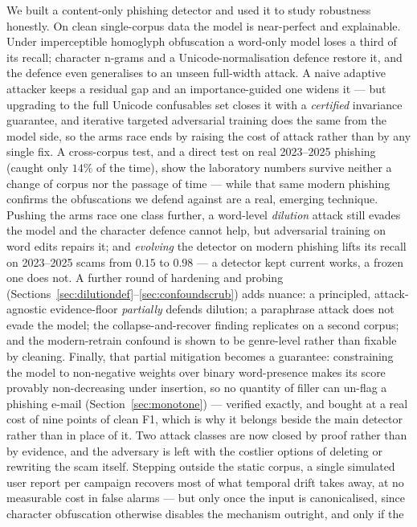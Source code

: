 \documentclass[11pt]{article}
\begin{document}
We built a content-only phishing detector and used it to study robustness honestly.
On clean single-corpus data the model is near-perfect and explainable. Under
imperceptible homoglyph obfuscation a word-only model loses a third of its recall;
character n-grams and a Unicode-normalisation defence restore it, and the defence
even generalises to an unseen full-width attack. A naive adaptive attacker keeps a
residual gap and an importance-guided one widens it --- but upgrading to the full Unicode
confusables set closes it with a \emph{certified} invariance guarantee, and iterative
targeted adversarial training does the same from the model side, so the arms race ends by
raising the cost of attack rather than by any single fix. A cross-corpus test, and a direct
test on real 2023--2025 phishing (caught only $14\%$ of the time), show the laboratory
numbers survive neither a change of corpus nor the passage of time --- while that same modern
phishing confirms the obfuscations we defend against are a real, emerging technique. Pushing the
arms race one class further, a word-level \emph{dilution} attack still evades the model and the
character defence cannot help, but adversarial training on word edits repairs it; and
\emph{evolving} the detector on modern phishing lifts its recall on 2023--2025 scams from $0.15$
to $0.98$ --- a detector kept current works, a frozen one does not.
A further round of hardening and probing (Sections~\ref{sec:dilutiondef}--\ref{sec:confoundscrub})
adds nuance: a principled, attack-agnostic evidence-floor \emph{partially} defends dilution; a
paraphrase attack does not evade the model; the collapse-and-recover finding replicates on a second
corpus; and the modern-retrain confound is shown to be genre-level rather than fixable by cleaning.
Finally, that partial mitigation becomes a guarantee: constraining the model to non-negative weights
over binary word-presence makes its score provably non-decreasing under insertion, so no quantity of
filler can un-flag a phishing e-mail (Section~\ref{sec:monotone}) --- verified exactly, and bought at a
real cost of nine points of clean F1, which is why it belongs beside the main detector rather than in
place of it. Two attack classes are now closed by proof rather than by evidence, and the adversary is
left with the costlier options of deleting or rewriting the scam itself.
Stepping outside the static corpus, a single simulated user report per campaign recovers most of what
temporal drift takes away, at no measurable cost in false alarms --- but only once the input is
canonicalised, since character obfuscation otherwise disables the mechanism outright, and only if the
\end{document}
